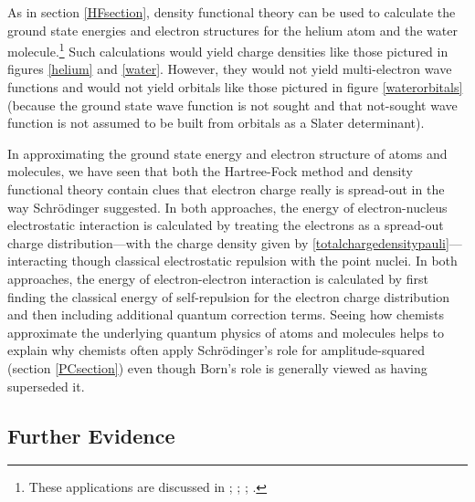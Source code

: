 \documentclass[onecolumn,secnumarabic,amsmath,amssymb,balancelastpage,nofootinbib]{article}
\begin{document}
As in section \ref{HFsection}, density functional theory can be used to calculate the ground state energies and electron structures for the helium atom and the water molecule.\footnote{These applications are discussed in \cite{kim1994}; \cite[sec.\ 8.9]{martin2004}; \cite{baseden2014}; \cite[pg.\ 571]{levineQC}.}  Such calculations would yield charge densities like those pictured in figures \ref{helium} and \ref{water}.  However, they would not yield multi-electron wave functions and would not yield orbitals like those pictured in figure \ref{waterorbitals} (because the ground state wave function is not sought and that not-sought wave function is not assumed to be built from orbitals as a Slater determinant).

In approximating the ground state energy and electron structure of atoms and molecules, we have seen that both the Hartree-Fock method and density functional theory contain clues that electron charge really is spread-out in the way Schr\"{o}dinger suggested.  In both approaches, the energy of electron-nucleus electrostatic interaction is calculated by treating the electrons as a spread-out charge distribution---with the charge density given by \eqref{totalchargedensitypauli}---interacting though classical electrostatic repulsion with the point nuclei.  In both approaches, the energy of electron-electron interaction is calculated by first finding the classical energy of self-repulsion for the electron charge distribution and then including additional quantum correction terms.  Seeing how chemists approximate the underlying quantum physics of atoms and molecules helps to explain why chemists often apply Schr\"{o}dinger's role for amplitude-squared (section \ref{PCsection}) even though Born's role is generally viewed as having superseded it.

\subsection{Further Evidence}\label{FEsection}
\end{document}
